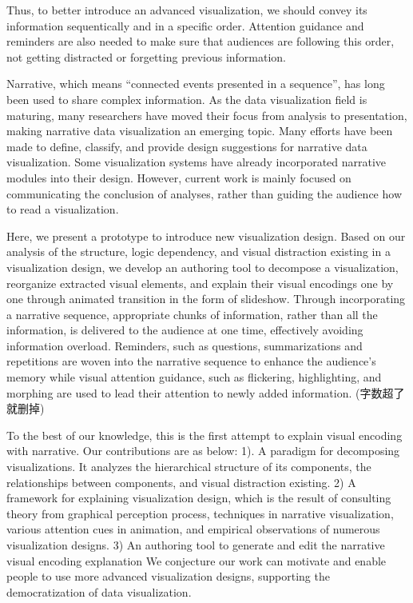 Thus, to better introduce an advanced visualization, we should convey its information sequentically and in a specific order. Attention guidance and reminders are also needed to make sure that audiences are following this order, not getting distracted or forgetting previous information.

Narrative, which means “connected events presented in a sequence”, has long been used to share complex information. \cite{schmidt_living_2017}As the data visualization field is maturing, many researchers have moved their focus from analysis to presentation, making narrative data visualization an emerging topic\cite{kosara_storytelling:_2013}. Many efforts have been
made to define, classify, and provide design suggestions for narrative data visualization\cite{segel_narrative_2010,hullman_deeper_2013,gershon_what_2001}. Some visualization systems have already incorporated narrative modules into their design\cite{eccles_stories_2007,bryan_temporal_2016}. However, current work is mainly focused on communicating the conclusion of analyses, rather than guiding the audience how to read a visualization. 

Here, we present a prototype to introduce new visualization design. Based on our analysis of the structure, logic dependency, and visual distraction existing in a visualization design, we develop an authoring tool to decompose a visualization, reorganize extracted visual elements, and explain their visual encodings one by one through animated transition in the form of slideshow. Through incorporating a narrative sequence, appropriate chunks of information, rather than all the information, is delivered to the audience at one time, effectively avoiding information overload. Reminders, such as questions, summarizations and repetitions are woven into the narrative sequence to enhance the audience’s memory while visual attention guidance, such as flickering, highlighting, and morphing are used to lead their attention to newly added information. (字数超了就删掉)

To the best of our knowledge, this is the first attempt to explain visual encoding with narrative. Our contributions are as below: 1). A paradigm for decomposing visualizations. It analyzes the hierarchical structure of its components, the relationships between components, and visual distraction existing. 2) A framework for explaining visualization design, which is the result of consulting theory from graphical perception process, techniques in narrative visualization, various attention cues in animation, and empirical observations of numerous visualization designs. 3) An authoring tool to generate and edit the narrative visual encoding explanation
 We conjecture our work can motivate and enable people to use more advanced visualization designs, supporting the democratization of data visualization.
 